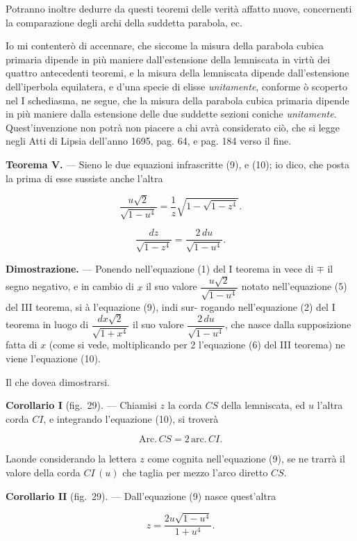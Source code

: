 \documentclass{article}
\begin{document}
Potranno inoltre dedurre da questi teoremi delle verità affatto nuove, concernenti la
comparazione degli archi della suddetta parabola, ec.

Io mi contenterò di accennare, che siccome la misura della parabola cubica primaria dipende in
più maniere dall'estensione della lemniscata in virtù dei quattro antecedenti teoremi, e la
misura della lemniscata dipende dall'estensione dell'iperbola equilatera, e d'una specie di
elisse \emph{unitamente}, conforme ò scoperto nel I schediasma, ne segue, che la misura della
parabola cubica primaria dipende in più maniere dalla estensione delle due suddette sezioni
coniche \emph{unitamente}. Quest'invenzione non potrà non piacere a chi avrà considerato ciò, che
si legge negli Atti di Lipsia dell'anno 1695, pag. 64, e pag. 184 verso il fine.

\textbf{Teorema V.} --- Sieno le due equazioni infrascritte (9), e (10); io dico, che posta la
prima di esse sussiste anche l'altra

\[ \frac{u\sqrt{2}}{\sqrt{1-u^{4}}} = \frac{1}{z}\sqrt{1-\sqrt{1-z^{4}}}. \tag{9} \]

\[ \frac{dz}{\sqrt{1-z^{4}}} = \frac{2\,du}{\sqrt{1-u^{4}}}. \tag{10} \]

\textbf{Dimostrazione.} --- Ponendo nell'equazione (1) del I teorema in vece di $\mp$ il segno
negativo, e in cambio di $x$ il suo valore $\dfrac{u\sqrt{2}}{\sqrt{1-u^{4}}}$ notato
nell'equazione (5) del III teorema, si à l'equazione (9), indi sur-
rogando nell'equazione (2) del I teorema in luogo di $\dfrac{dx\sqrt{2}}{\sqrt{1+x^{4}}}$ il suo
valore $\dfrac{2\,du}{\sqrt{1-u^{4}}}$, che nasce dalla supposizione fatta di $x$ (come si vede,
moltiplicando per 2 l'equazione (6) del III teorema) ne viene l'equazione (10).

Il che dovea dimostrarsi.

\textbf{Corollario I} (fig.~29). --- Chiamisi $z$ la corda $CS$ della lemniscata, ed $u$ l'altra
corda $CI$, e integrando l'equazione (10), si troverà

\[ \mathrm{Arc.}\,CS = 2\,\mathrm{arc.}\,CI. \]

Laonde considerando la lettera $z$ come cognita nell'equazione (9), se ne trarrà il valore della
corda $CI\,(u)$ che taglia per mezzo l'arco diretto $CS$.

\textbf{Corollario II} (fig.~29). --- Dall'equazione (9) nasce quest'altra

\[ z = \frac{2u\sqrt{1-u^{4}}}{1+u^{4}}. \tag{11} \]
\end{document}
